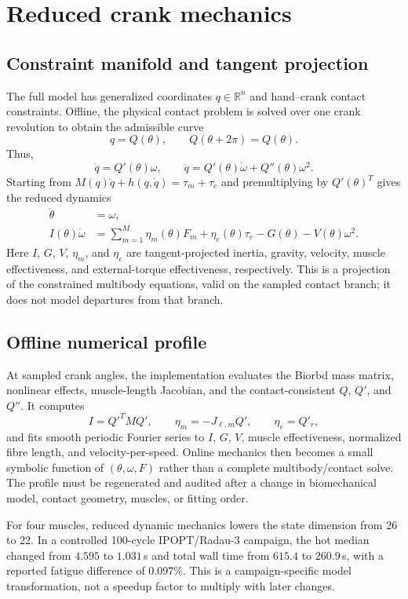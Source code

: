 \documentclass[10pt]{article}
\begin{document}
\section{Reduced crank mechanics}

\subsection{Constraint manifold and tangent projection}

The full model has generalized coordinates $q\in\mathbb{R}^n$ and hand--crank contact constraints. Offline, the physical contact problem is solved over one crank revolution to obtain the admissible curve
\[
q=Q(\theta), \qquad Q(\theta+2\pi)=Q(\theta).
\]
Thus,
\[
\dot q=Q'(\theta)\omega, \qquad
\ddot q=Q'(\theta)\dot\omega+Q''(\theta)\omega^2.
\]
Starting from $M(q)\ddot q+h(q,\dot q)=\tau_m+\tau_e$ and premultiplying by $Q'(\theta)^T$ gives the reduced dynamics
\begin{align}
\dot\theta &= \omega,\\
I(\theta)\dot\omega &= \sum_{m=1}^M \eta_m(\theta)F_m+\eta_e(\theta)\tau_e-G(\theta)-V(\theta)\omega^2.
\end{align}
Here $I$, $G$, $V$, $\eta_m$, and $\eta_e$ are tangent-projected inertia, gravity, velocity, muscle effectiveness, and external-torque effectiveness, respectively. This is a projection of the constrained multibody equations, valid on the sampled contact branch; it does not model departures from that branch.

\subsection{Offline numerical profile}

At sampled crank angles, the implementation evaluates the Biorbd mass matrix, nonlinear effects, muscle-length Jacobian, and the contact-consistent $Q$, $Q'$, and $Q''$. It computes
\[
I=Q'^TMQ', \qquad \eta_m=-J_{\ell,m}Q', \qquad \eta_e=Q'_r,
\]
and fits smooth periodic Fourier series to $I$, $G$, $V$, muscle effectiveness, normalized fibre length, and velocity-per-speed. Online mechanics then becomes a small symbolic function of $(\theta,\omega,F)$ rather than a complete multibody/contact solve. The profile must be regenerated and audited after a change in biomechanical model, contact geometry, muscles, or fitting order.

For four muscles, reduced dynamic mechanics lowers the state dimension from 26 to 22. In a controlled 100-cycle IPOPT/Radau-3 campaign, the hot median changed from $4.595$ to $1.031\,$s and total wall time from $615.4$ to $260.9\,$s, with a reported fatigue difference of $0.097\%$. This is a campaign-specific model transformation, not a speedup factor to multiply with later changes.
\end{document}
